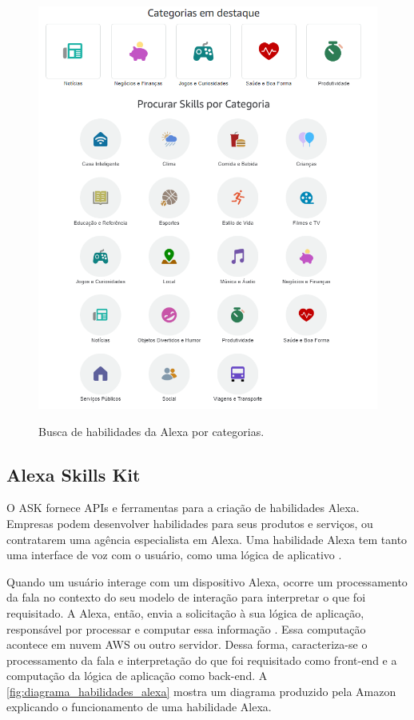 \begin{figure}[htbp]
    \centering
    \caption{Busca de habilidades da Alexa por categorias.}
    \includegraphics[scale=0.8]{Imagens/alexa_skills_categorias.png}
    \label{fig:alexa_skills_categorias}
\end{figure}

\subsection{Alexa Skills Kit}\label{subsection:alexa_skills_kit}
O ASK fornece APIs e ferramentas para a criação de habilidades Alexa. Empresas podem desenvolver habilidades para seus produtos e serviços, ou contratarem uma agência especialista em Alexa. Uma habilidade Alexa tem tanto uma interface de voz com o usuário, como uma lógica de aplicativo \cite{ref:029}.

Quando um usuário interage com um dispositivo Alexa, ocorre um processamento da fala no contexto do seu modelo de interação para interpretar o que foi requisitado. A Alexa, então, envia a solicitação à sua lógica de aplicação, responsável por processar e computar essa informação \cite{ref:029}. Essa computação acontece em nuvem AWS ou outro servidor. Dessa forma, caracteriza-se o processamento da fala e interpretação do que foi requisitado como front-end e a computação da lógica de aplicação como back-end. A \autoref{fig:diagrama_habilidades_alexa} mostra um diagrama produzido pela Amazon explicando o funcionamento de uma habilidade Alexa.

